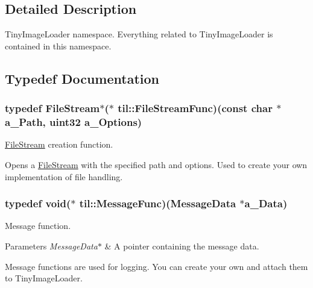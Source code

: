 \subsection{Detailed Description}
TinyImageLoader namespace. Everything related to TinyImageLoader is contained in this namespace. 

\subsection{Typedef Documentation}
\hypertarget{namespacetil_ad2bb0fc50e3103fc00335b66adf272c8}{
\subsubsection[{FileStreamFunc}]{\setlength{\rightskip}{0pt plus 5cm}typedef {\bf FileStream}$\ast$($\ast$ {\bf til::FileStreamFunc})(const char $\ast$a\_\-Path, {\bf uint32} a\_\-Options)}}
\label{namespacetil_ad2bb0fc50e3103fc00335b66adf272c8}


\hyperlink{classtil_1_1_file_stream}{FileStream} creation function. 

Opens a \hyperlink{classtil_1_1_file_stream}{FileStream} with the specified path and options. Used to create your own implementation of file handling. \hypertarget{namespacetil_a4cd3def0937f0e817958cdcc44241549}{
\subsubsection[{MessageFunc}]{\setlength{\rightskip}{0pt plus 5cm}typedef void($\ast$ {\bf til::MessageFunc})({\bf MessageData} $\ast$a\_\-Data)}}
\label{namespacetil_a4cd3def0937f0e817958cdcc44241549}


Message function. 


\begin{DoxyParams}{Parameters}
{\em MessageData$\ast$} & A pointer containing the message data.\\
\hline
\end{DoxyParams}
Message functions are used for logging. You can create your own and attach them to TinyImageLoader. 

